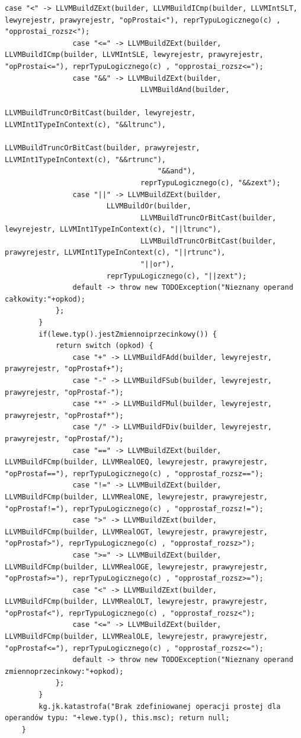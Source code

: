 \begin{lstlisting}[basicstyle=\scriptsize]
                case "<" -> LLVMBuildZExt(builder, LLVMBuildICmp(builder, LLVMIntSLT, lewyrejestr, prawyrejestr, "opProstai<"), reprTypuLogicznego(c) , "opprostai_rozsz<");
                case "<=" -> LLVMBuildZExt(builder, LLVMBuildICmp(builder, LLVMIntSLE, lewyrejestr, prawyrejestr, "opProstai<="), reprTypuLogicznego(c) , "opprostai_rozsz<=");
                case "&&" -> LLVMBuildZExt(builder,
                                LLVMBuildAnd(builder,
                                        LLVMBuildTruncOrBitCast(builder, lewyrejestr, LLVMInt1TypeInContext(c), "&&ltrunc"),
                                        LLVMBuildTruncOrBitCast(builder, prawyrejestr, LLVMInt1TypeInContext(c), "&&rtrunc"),
                                    "&&and"),
                                reprTypuLogicznego(c), "&&zext");
                case "||" -> LLVMBuildZExt(builder,
                        LLVMBuildOr(builder,
                                LLVMBuildTruncOrBitCast(builder, lewyrejestr, LLVMInt1TypeInContext(c), "||ltrunc"),
                                LLVMBuildTruncOrBitCast(builder, prawyrejestr, LLVMInt1TypeInContext(c), "||rtrunc"),
                                "||or"),
                        reprTypuLogicznego(c), "||zext");
                default -> throw new TODOException("Nieznany operand całkowity:"+opkod);
            };
        }
        if(lewe.typ().jestZmiennoiprzecinkowy()) {
            return switch (opkod) {
                case "+" -> LLVMBuildFAdd(builder, lewyrejestr, prawyrejestr, "opProstaf+");
                case "-" -> LLVMBuildFSub(builder, lewyrejestr, prawyrejestr, "opProstaf-");
                case "*" -> LLVMBuildFMul(builder, lewyrejestr, prawyrejestr, "opProstaf*");
                case "/" -> LLVMBuildFDiv(builder, lewyrejestr, prawyrejestr, "opProstaf/");
                case "==" -> LLVMBuildZExt(builder, LLVMBuildFCmp(builder, LLVMRealOEQ, lewyrejestr, prawyrejestr, "opProstaf=="), reprTypuLogicznego(c) , "opprostaf_rozsz==");
                case "!=" -> LLVMBuildZExt(builder, LLVMBuildFCmp(builder, LLVMRealONE, lewyrejestr, prawyrejestr, "opProstaf!="), reprTypuLogicznego(c) , "opprostaf_rozsz!=");
                case ">" -> LLVMBuildZExt(builder, LLVMBuildFCmp(builder, LLVMRealOGT, lewyrejestr, prawyrejestr, "opProstaf>"), reprTypuLogicznego(c) , "opprostaf_rozsz>");
                case ">=" -> LLVMBuildZExt(builder, LLVMBuildFCmp(builder, LLVMRealOGE, lewyrejestr, prawyrejestr, "opProstaf>="), reprTypuLogicznego(c) , "opprostaf_rozsz>=");
                case "<" -> LLVMBuildZExt(builder, LLVMBuildFCmp(builder, LLVMRealOLT, lewyrejestr, prawyrejestr, "opProstaf<"), reprTypuLogicznego(c) , "opprostaf_rozsz<");
                case "<=" -> LLVMBuildZExt(builder, LLVMBuildFCmp(builder, LLVMRealOLE, lewyrejestr, prawyrejestr, "opProstaf<="), reprTypuLogicznego(c) , "opprostaf_rozsz<=");
                default -> throw new TODOException("Nieznany operand zmiennoprzecinkowy:"+opkod);
            };
        }
        kg.jk.katastrofa("Brak zdefiniowanej operacji prostej dla operandów typu: "+lewe.typ(), this.msc); return null;
    } 
\end{lstlisting}
